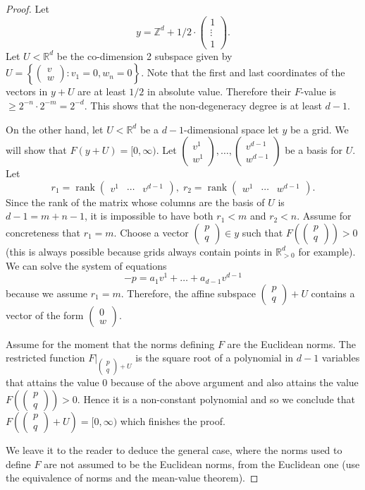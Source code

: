 \documentclass[reqno,11pt, twoside]{amsart}
\theoremstyle{plain}
\theoremstyle{definition}
\theoremstyle{definition}
\theoremstyle{remark}
\numberwithin{equation}{section}
\newcommand{\bR}{\mathbb{R}}
\newcommand{\bZ}{\mathbb{Z}}
\newcommand\seta[1]{\left\{#1\right\}}
\newcommand\pa[1]{\left(#1\right)}
\newcommand\on[1]{\operatorname{#1}}
\newcommand\mat[1]{\pa{\begin{matrix}#1\end{matrix}}}
\newcommand\smallmat[1]{\pa{\begin{smallmatrix}#1\end{smallmatrix}}}
\begin{document}
\begin{proof}
    Let 
    $$y=\bZ^d + 1/2\cdot\mat{1\\ \vdots \\ 1}.$$
    Let $U<\bR^d$ be the co-dimension 2 subspace given by $U=\seta{\smallmat{v\\w}:v_1=0, w_n=0}$. Note that the first and last coordinates of the vectors in $y+U$
    are at least $1/2$ in absolute value. Therefore their $F$-value is $\ge 2^{-n}\cdot 2^{-m} = 2^{-d}.$ This shows that the non-degeneracy degree is at least $d-1$. 

    On the other hand, let $U<\bR^d$ be a $d-1$-dimensional space  let $y$ be a grid. We will show that $F(y+U)=[0,\infty).$ 
    Let $\smallmat{v^{1}\\w^{1}},\dots, \smallmat{v^{d-1}\\w^{d-1}}$ be a basis for $U$. Let 
    $$r_1 = \on{rank}\smallmat{v^1&\cdots& v^{d-1}},\; r_2 = 
    \on{rank}\smallmat{w^1&\cdots& w^{d-1}}.$$
    Since the rank of the matrix whose columns are the basis of $U$ is $d-1=m+n-1$, it is impossible to have both $r_1< m$ and $r_2< n$. Assume for concreteness that $r_1=m$. Choose a vector $\smallmat{p\\q}\in y$ such that $F(\smallmat{p\\q})>0$ (this is always possible because grids always contain points in $\bR^d_{>0}$ for example). We can solve the system of equations
    $$-p = a_1v^1+\dots +a_{d-1}v^{d-1}$$
    because we assume $r_1=m$. Therefore, the affine subspace $\smallmat{p\\q}+U$ contains a vector of the form $\smallmat{0\\w}$. 

    Assume for the moment that the norms defining $F$ are the Euclidean norms. The restricted function $F|_{\smallmat{p\\q}+U}$ is the square root of a polynomial in $d-1$ variables that attains the value 0 because of the above argument and also attains the value $F(\smallmat{p\\q})>0$. Hence it is a non-constant polynomial and so we conclude that $F(\smallmat{p\\q}+U) = [0,\infty)$ which finishes the proof. 

    We leave it to the reader to deduce the general case, where the norms used to define $F$ are not assumed to be the Euclidean norms, from the Euclidean one (use the equivalence of norms and the mean-value theorem).
    

\end{proof}
\end{document}
